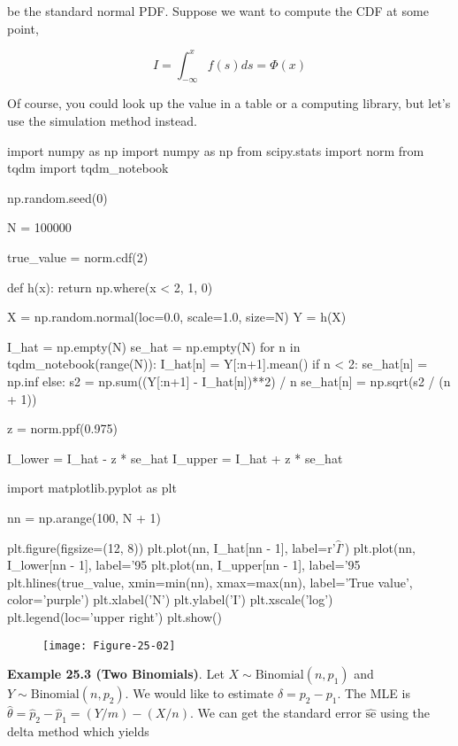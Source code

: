 be the standard normal PDF. Suppose we want to compute the CDF at some
point,

\[ I = \int_{-\infty}^x f(s) ds = \Phi(x) \]

Of course, you could look up the value in a table or a computing
library, but let's use the simulation method instead.

\begin{python}
import numpy as np
import numpy as np
from scipy.stats import norm
from tqdm import tqdm_notebook

np.random.seed(0)

N = 100000

true_value = norm.cdf(2)

def h(x):
    return np.where(x < 2, 1, 0)

X = np.random.normal(loc=0.0, scale=1.0, size=N)
Y = h(X)

I_hat = np.empty(N)
se_hat = np.empty(N)
for n in tqdm_notebook(range(N)):
    I_hat[n] = Y[:n+1].mean()
    if n < 2:
        se_hat[n] = np.inf
    else:
        s2 = np.sum((Y[:n+1] - I_hat[n])**2) / n
        se_hat[n] = np.sqrt(s2 / (n + 1))
        
z = norm.ppf(0.975)

I_lower = I_hat - z * se_hat
I_upper = I_hat + z * se_hat
\end{python}

\begin{python}
import matplotlib.pyplot as plt

nn = np.arange(100, N + 1)

plt.figure(figsize=(12, 8))
plt.plot(nn, I_hat[nn - 1], label=r'$\hat{I}$')
plt.plot(nn, I_lower[nn - 1], label='95%
plt.plot(nn, I_upper[nn - 1], label='95%
plt.hlines(true_value, xmin=min(nn), xmax=max(nn), label='True value', color='purple')
plt.xlabel('N')
plt.ylabel('I')
plt.xscale('log')
plt.legend(loc='upper right')
plt.show()
\end{python}

\begin{figure}[H]
\texttt{[image: Figure-25-02]}
\end{figure}

\textbf{Example 25.3 (Two Binomials)}. Let
\(X \sim \text{Binomial}(n, p_1)\) and
\(Y \sim \text{Binomial}(n, p_2)\). We would like to estimate
\(\delta = p_2 - p_1\). The MLE is
\(\hat{\theta} = \hat{p}_2 - \hat{p}_1 = (Y / m) - (X / n)\). We can get
the standard error \(\hat{\text{se}}\) using the delta method which
yields

